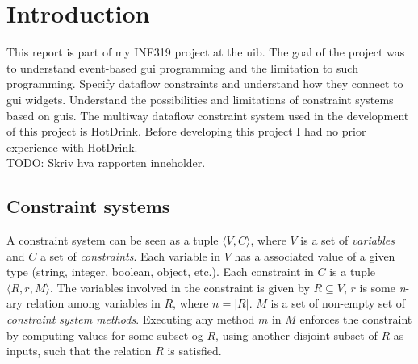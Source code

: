 \chapter{Introduction}

This report is part of my INF319 project at the \gls{uib}. The goal of the project was to
understand event-based \gls{gui} programming and the limitation to such programming.
Specify dataflow constraints and understand how they connect to \gls{gui} widgets.
Understand the possibilities and limitations of constraint systems based on \gls{gui}s.
The multiway dataflow constraint system used in the development of this project is
HotDrink. Before developing this project I had no prior experience with HotDrink. 
\\TODO: Skriv hva rapporten inneholder.
\newpage

\section{Constraint systems}
\label{sec:constraint-systems}
A constraint system can be seen as a tuple ${\langle V, C \rangle}$, where $V$ is a set 
of \textit{variables} and $C$ a set of \textit{constraints}. Each variable in $V$ has a 
associated value of a given type (string, integer, boolean, object, etc.). Each 
constraint in $C$ is a tuple ${\langle R, r, M \rangle}$. The variables involved in the 
constraint is given by ${R \subseteq V}$, $r$ is some \textit{n}-ary relation among 
variables in $R$, where ${n = \lvert R \rvert}$. $M$ is a set of non-empty set of 
\textit{constraint system methods}. Executing any method $m$ in $M$ enforces the 
constraint by computing values for some subset og $R$, using another disjoint subset of 
$R$ as inputs, such that the relation $R$ is satisfied. 

